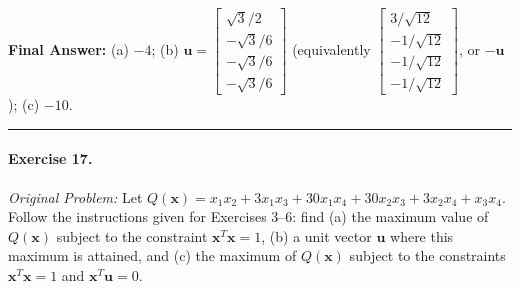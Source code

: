 \documentclass[11pt, letterpaper]{article}
\theoremstyle{definition}
\theoremstyle{remark}
\begin{document}
\textbf{Final Answer:} (a) $-4$; \quad (b) $\mathbf{u} = \begin{bmatrix} \sqrt{3}/2 \\ -\sqrt{3}/6 \\ -\sqrt{3}/6 \\ -\sqrt{3}/6 \end{bmatrix}$ (equivalently $\begin{bmatrix} 3/\sqrt{12} \\ -1/\sqrt{12} \\ -1/\sqrt{12} \\ -1/\sqrt{12} \end{bmatrix}$, or $-\mathbf{u}$); \quad (c) $-10$.

\medskip
\hrule
\medskip

\paragraph{Exercise 17.}
\emph{Original Problem:} Let $Q(\mathbf{x}) = x_1 x_2 + 3x_1 x_3 + 30x_1 x_4 + 30x_2 x_3 + 3x_2 x_4 + x_3 x_4$. Follow the instructions given for Exercises 3--6: find (a) the maximum value of $Q(\mathbf{x})$ subject to the constraint $\mathbf{x}^T \mathbf{x} = 1$, (b) a unit vector $\mathbf{u}$ where this maximum is attained, and (c) the maximum of $Q(\mathbf{x})$ subject to the constraints $\mathbf{x}^T \mathbf{x} = 1$ and $\mathbf{x}^T \mathbf{u} = 0$.
\end{document}
